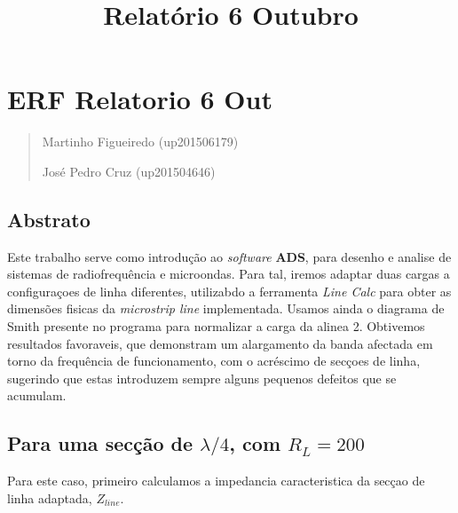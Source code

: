 \documentclass[11pt]{article}
\title{Relatório 6 Outubro}
\begin{document}
    
    \maketitle
    
    

    
    \hypertarget{erf-relatorio-6-out}{%
\section{ERF Relatorio 6 Out}\label{erf-relatorio-6-out}}

\begin{quote}
Martinho Figueiredo (up201506179)

José Pedro Cruz (up201504646)
\end{quote}

    \hypertarget{abstrato}{%
\subsection{Abstrato}\label{abstrato}}

Este trabalho serve como introdução ao \emph{software} \textbf{ADS},
para desenho e analise de sistemas de radiofrequência e microondas. Para
tal, iremos adaptar duas cargas a configuraçoes de linha diferentes,
utilizabdo a ferramenta \emph{Line Calc} para obter as dimensões fisicas
da \emph{microstrip line} implementada. Usamos ainda o diagrama de Smith
presente no programa para normalizar a carga da alinea 2. Obtivemos
resultados favoraveis, que demonstram um alargamento da banda afectada
em torno da frequência de funcionamento, com o acréscimo de secçoes de
linha, sugerindo que estas introduzem sempre alguns pequenos defeitos
que se acumulam.

\hypertarget{para-uma-secuxe7uxe3o-de-lambda4-com-r_l-200}{%
\subsection{\texorpdfstring{Para uma secção de \(\lambda/4\), com
\(R_L = 200\)}{Para uma secção de \textbackslash lambda/4, com R\_L = 200}}\label{para-uma-secuxe7uxe3o-de-lambda4-com-r_l-200}}

Para este caso, primeiro calculamos a impedancia caracteristica da
secçao de linha adaptada, \(Z_{line}\).
\end{document}
